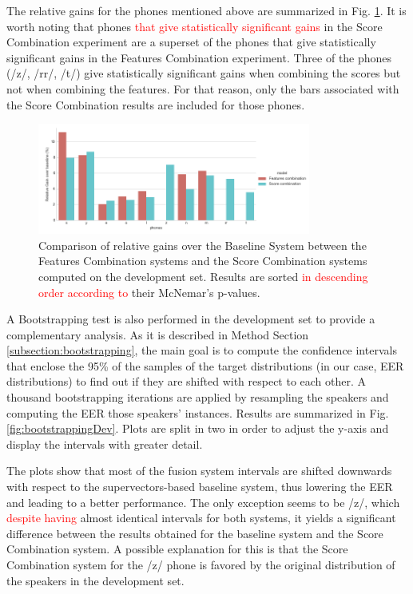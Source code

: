The relative gains for the phones mentioned above are summarized in
Fig. \ref{fig:fusionMcnemarDev}.
It is worth noting that phones \textcolor{red}{that give statistically significant gains} in
the Score Combination experiment are a superset of the phones that give statistically
significant gains in the Features Combination experiment.
Three of the phones (/z/, /rr/, /t/) give statistically significant gains
when combining the scores but not when combining the features.
For that reason, only the bars associated with the Score Combination results are
included for those phones.

\begin{figure}[H]
	\centering
	\includegraphics[width=0.8\textwidth]{files/figures/results/relatives/relatives-fusion-systems-dev-mcnemar.png}
	\caption{Comparison of relative gains over the Baseline System
	between the Features Combination systems
	and the Score Combination systems
	computed on the development set.
	Results are sorted \textcolor{red}{in descending order according to} their McNemar's p-values.}
	\label{fig:fusionMcnemarDev}
\end{figure}

A Bootstrapping test is also performed in the development set to provide a complementary
analysis. As it is described in Method Section \ref{subsection:bootstrapping}, the main goal
is to compute the confidence intervals that enclose the 95\% of the samples of
the target distributions (in our case, EER distributions) to find out if they are shifted
with respect to each other. A thousand bootstrapping iterations are applied by resampling
the speakers and computing the EER those speakers' instances. Results are summarized in Fig. \ref{fig:bootstrappingDev}. Plots are split in two in order to adjust the y-axis and display the intervals
with greater detail.

The plots show that most of the fusion system intervals are shifted downwards with
respect to the supervectors-based baseline system, thus lowering the EER and leading
to a better performance.
The only exception seems to be /z/, which
\textcolor{red}{despite having} almost identical intervals for both systems,
it yields a significant difference
between the results obtained for the baseline system and the Score Combination system.
A possible explanation for this is that the Score Combination system for the /z/
phone is favored by the original distribution of the speakers in the development set.

